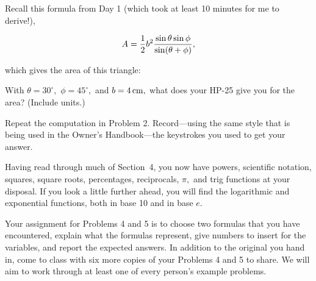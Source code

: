 \bigskip

\nobreak\bigskip


\noindent Recall this formula from Day 1 (which took at least 10 minutes for me to derive!),

$$A={1\over 2} b^2 {\sin\theta \sin\phi \over \sin (\theta + \phi)},$$

\noindent which gives the area of this triangle:

\midinsert
\centerline{}
\endinsert
\nobreak\bigskip

\noindent With $\theta = 30^{\circ},$ $\phi = 45^{\circ},$ and $b = 4\thinspace{\rm cm},$ what does your HP-25 give you for the area? (Include units.)

\bigskip

\nobreak\bigskip

\noindent Repeat the computation in Problem 2. Record---using the same style that is being used in the {\rm Owner's Handbook}---the keystrokes you used to get your answer.

\bigskip

\nobreak\bigskip

\noindent Having read through much of Section~4, you now have powers, scientific notation, squares, square roots, percentages, reciprocals, $\pi,$ and trig functions at your disposal. If you look a little
further ahead, you will find the logarithmic and exponential functions, both in base 10 and in base $e$.

Your assignment for Problems 4 and 5 is to choose two formulas that you have encountered, explain what the formulas represent, 
give numbers to insert for the variables, and report the expected answers. In addition to the original you hand in, come to class with six more copies of your Problems 4 and 5 to share. We will aim to work through at least one of every person's example problems.

\bye
